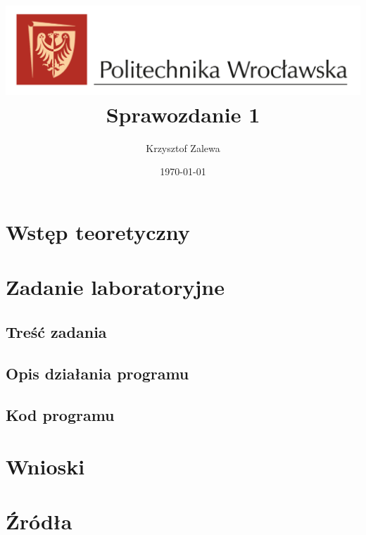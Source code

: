 \documentclass{article}
\title{
  \centering
  \includegraphics[width=\textwidth]{images/logo_PWr_kolor_poziom.png}\\
  \fontsize{28pt}{30pt}\selectfont Sprawozdanie 1\\
  }
\author{Krzysztof Zalewa}
\date{\daymonthyear\today}
\begin{document}
    \maketitle
    \pagebreak
    \tableofcontents
    \FloatBarrier
    \section{Wstęp teoretyczny}
        
    \section{Zadanie laboratoryjne}
        \subsection{Treść zadania}

        \subsection{Opis działania programu}

        \subsection{Kod programu}

    \section{Wnioski}

    \section{Źródła}
    
\end{document}
